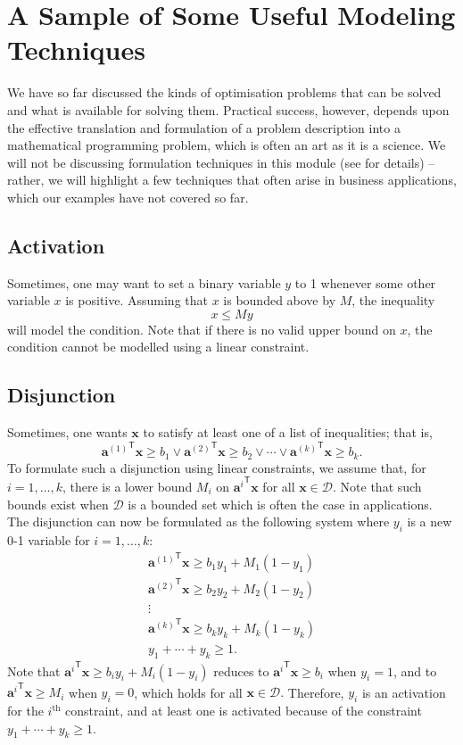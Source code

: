 \section{A Sample of Some Useful Modeling
Techniques}
We have so far discussed the kinds of optimisation problems that can be
solved and what is available for solving them. Practical success, however, depends upon the effective translation and formulation of a problem description into a mathematical
programming problem, which is often an art as it is a science. We will not be discussing formulation techniques in this module (see \cite{OPT_W} for details) -- rather, we will  highlight  a few techniques
that often arise in business applications, which our examples have not covered so far. 
\subsection{Activation}
Sometimes, one may want to set a binary variable \(y\) to 1 whenever some
other variable \(x\) is positive. Assuming that \(x\) is bounded above
by \(M\), the inequality \[x \leq My\] will model the condition. Note that if there is no valid upper bound on \(x\), the condition cannot be modelled using a linear constraint.

\subsection{Disjunction}

Sometimes, one wants \(\mathbf{x}\) to satisfy at least one of a list of
inequalities; that is,
\[{\mathbf{a}^{(1)}}^\mathsf{T}\mathbf{x} \geq b_1 
 \lor {\mathbf{a}^{(2)}}^\mathsf{T}\mathbf{x} \geq b_2 
      \lor \cdots 
 \lor {\mathbf{a}^{(k)}}^\mathsf{T}\mathbf{x} \geq b_k.\] To formulate
such a disjunction using linear constraints, we assume that, for \(i = 1,\ldots,k\), there is a lower bound \(M_i\) on
\({\mathbf{a}^i}^\mathsf{T}\mathbf{x}\) for all
\(\mathbf{x}\in \mathcal{D}\). Note that such bounds exist when
\(\mathcal{D}\) is a bounded set which is often the case in
applications. The disjunction can now be formulated as the following
system where \(y_i\) is a new 0-1 variable for \(i = 1,\ldots,k\):
\[\begin{array}{l}
 {\mathbf{a}^{(1)}}^\mathsf{T}\mathbf{x} \geq b_1 y_1 + M_1(1-y_1) \\
 {\mathbf{a}^{(2)}}^\mathsf{T}\mathbf{x} \geq b_2 y_2 + M_2(1-y_2) \\
  \vdots \\
 {\mathbf{a}^{(k)}}^\mathsf{T}\mathbf{x} \geq b_k y_k + M_k(1-y_k) \\
  y_1 + \cdots + y_k \geq 1.
\end{array}\] Note that
\({\mathbf{a}^i}^\mathsf{T}\mathbf{x} \geq b_i y_i + M_i(1-y_i)\)
reduces to \({\mathbf{a}^i}^\mathsf{T}\mathbf{x} \geq b_i\) when
\(y_i = 1\), and to \({\mathbf{a}^i}^\mathsf{T}\mathbf{x} \geq M_i\)
when \(y_i = 0\), which holds for all \(\mathbf{x} \in \mathcal{D}.\)
Therefore, \(y_i\) is an activation for the \(i^{\textrm{th}}\) constraint, and at least one is
activated because of the constraint \(y_1 + \cdots + y_k \geq 1\).

